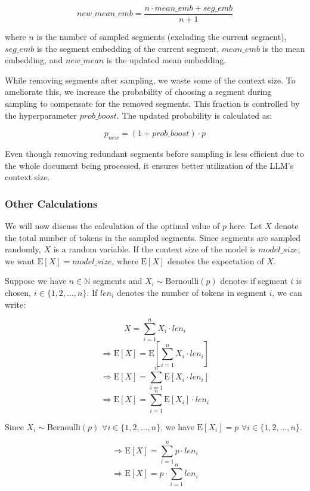 			\[ new\_mean\_emb = \frac{n \cdot mean\_emb + seg\_emb}{n + 1} \]

			where $n$ is the number of sampled segments (excluding the current segment), $seg\_emb$ is the
			segment embedding of the current segment, $mean\_emb$ is the mean embedding, and $new\_mean$ is
			the updated mean embedding.

			While removing segments after sampling, we waste some of the context size.
			To ameliorate this, we increase the probability of choosing a segment during sampling to
			compensate for the removed segments.
			This fraction is controlled by the hyperparameter $prob\_boost$.
			The updated probability is calculated as:
			
			\[ p_{new} = (1 + prob\_boost) \cdot p \]

			Even though removing redundant segments before sampling is less efficient due to the whole
			document being processed, it ensures better utilization of the LLM's context size.

		\subsubsection*{Other Calculations}
		
			We will now discuss the calculation of the optimal value of $p$ here.
			Let $X$ denote the total number of tokens in the sampled segments.
			Since segments are sampled randomly, $X$ is a random variable.
			If the context size of the model is $model\_size$, we want $\mathrm{E}[X] = model\_size$,
			where $\mathrm{E}[X]$ denotes the expectation of $X$.

			Suppose we have $n \in \mathbb{N}$ segments and $X_i \sim \mathrm{Bernoulli}(p)$ denotes
			if segment $i$ is chosen, $i \in \{1, 2, \dots, n\}$.
			If $len_i$ denotes the number of tokens in segment $i$, we can write:

			\[ X = \sum_{i = 1}^{n} X_i \cdot len_i \]
			\[ \Rightarrow \mathrm{E}[X] = \mathrm{E}[\sum_{i = 1}^{n} X_i \cdot len_i] \]
			\[ \Rightarrow \mathrm{E}[X] = \sum_{i = 1}^{n} \mathrm{E}[X_i \cdot len_i] \]
			\[ \Rightarrow \mathrm{E}[X] = \sum_{i = 1}^{n} \mathrm{E}[X_i] \cdot len_i \]

			Since $X_i \sim \mathrm{Bernoulli}(p)$ $\forall i \in \{1, 2, \dots, n\}$, we
			have $\mathrm{E}[X_i] = p$ $\forall i \in \{1, 2, \dots, n\}$.

			\[ \Rightarrow \mathrm{E}[X] = \sum_{i = 1}^{n} p \cdot len_i \]
			\[ \Rightarrow \mathrm{E}[X] = p \cdot \sum_{i = 1}^{n} len_i \]

